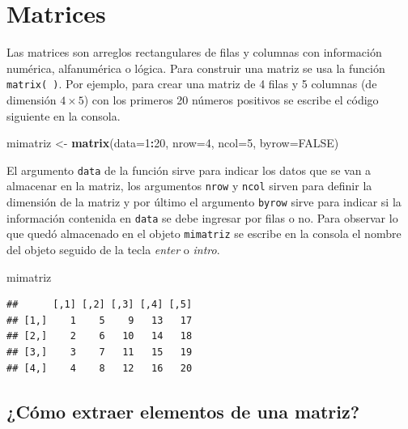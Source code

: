 \documentclass[10pt,]{krantz}
\makeatletter
\newenvironment{Shaded}{\begin{snugshade}}{\end{snugshade}}
\newcommand{\KeywordTok}[1]{\textcolor[rgb]{0.13,0.29,0.53}{\textbf{#1}}}
\newcommand{\DataTypeTok}[1]{\textcolor[rgb]{0.13,0.29,0.53}{#1}}
\newcommand{\DecValTok}[1]{\textcolor[rgb]{0.00,0.00,0.81}{#1}}
\newcommand{\StringTok}[1]{\textcolor[rgb]{0.31,0.60,0.02}{#1}}
\newcommand{\OtherTok}[1]{\textcolor[rgb]{0.56,0.35,0.01}{#1}}
\newcommand{\OperatorTok}[1]{\textcolor[rgb]{0.81,0.36,0.00}{\textbf{#1}}}
\newcommand{\NormalTok}[1]{#1}
\newenvironment{kframe}{%
\medskip{}
\setlength{\fboxsep}{.8em}
 \def\at@end@of@kframe{}%
 \ifinner\ifhmode%
  \def\at@end@of@kframe{\end{minipage}}%
  \begin{minipage}{\columnwidth}%
 \fi\fi%
 \def\FrameCommand##1{\hskip\@totalleftmargin \hskip-\fboxsep
 \colorbox{shadecolor}{##1}\hskip-\fboxsep
     \hskip-\linewidth \hskip-\@totalleftmargin \hskip\columnwidth}%
 \MakeFramed {\advance\hsize-\width
   \@totalleftmargin\z@ \linewidth\hsize
   \@setminipage}}%
 {\par\unskip\endMakeFramed%
 \at@end@of@kframe}
\renewenvironment{Shaded}{\begin{kframe}}{\end{kframe}}
\makeatother
\begin{document}
\section{Matrices}\label{matrices}

Las matrices  son arreglos rectangulares de filas y
columnas con información numérica, alfanumérica o lógica. Para construir
una matriz se usa la función \texttt{matrix(\ )}. Por ejemplo, para
crear una matriz de 4 filas y 5 columnas (de dimensión \(4 \times 5\))
con los primeros 20 números positivos se escribe el código siguiente en
la consola.

\begin{Shaded}
\begin{Highlighting}[]
\NormalTok{mimatriz <-}\StringTok{ }\KeywordTok{matrix}\NormalTok{(}\DataTypeTok{data=}\DecValTok{1}\OperatorTok{:}\DecValTok{20}\NormalTok{, }\DataTypeTok{nrow=}\DecValTok{4}\NormalTok{, }\DataTypeTok{ncol=}\DecValTok{5}\NormalTok{, }\DataTypeTok{byrow=}\OtherTok{FALSE}\NormalTok{)}
\end{Highlighting}
\end{Shaded}

El argumento \texttt{data} de la función sirve para indicar los datos
que se van a almacenar en la matriz, los argumentos \texttt{nrow} y
\texttt{ncol} sirven para definir la dimensión de la matriz y por último
el argumento \texttt{byrow} sirve para indicar si la información
contenida en \texttt{data} se debe ingresar por filas o no. Para
observar lo que quedó almacenado en el objeto \texttt{mimatriz} se
escribe en la consola el nombre del objeto seguido de la tecla
\textit{enter} o \textit{intro}.

\begin{Shaded}
\begin{Highlighting}[]
\NormalTok{mimatriz}
\end{Highlighting}
\end{Shaded}

\begin{verbatim}
##      [,1] [,2] [,3] [,4] [,5]
## [1,]    1    5    9   13   17
## [2,]    2    6   10   14   18
## [3,]    3    7   11   15   19
## [4,]    4    8   12   16   20
\end{verbatim}

\subsection{¿Cómo extraer elementos de una
matriz?}\label{como-extraer-elementos-de-una-matriz}
\end{document}

